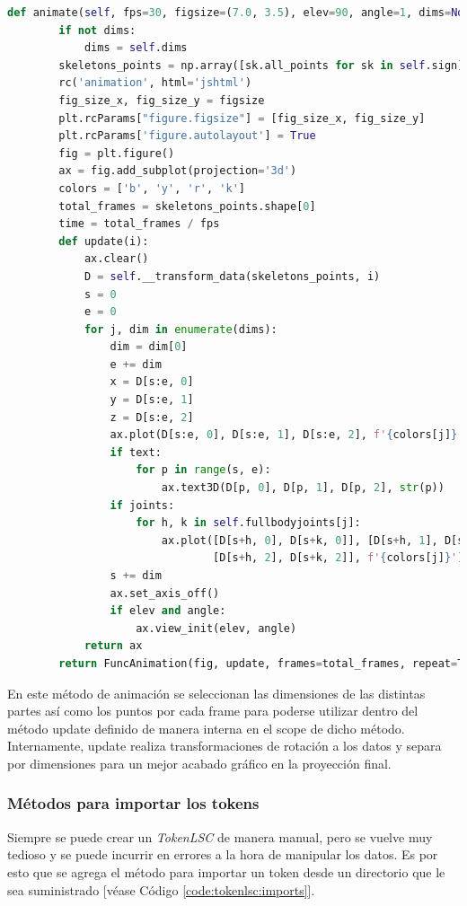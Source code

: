 \begin{lstlisting}[basicstyle=\tiny,language=Python, caption={Método animate de la clase TokenLSC}, label={code:tokenlsc:animate}] 
def animate(self, fps=30, figsize=(7.0, 3.5), elev=90, angle=1, dims=None, text=False, joints=True):
        if not dims:
            dims = self.dims
        skeletons_points = np.array([sk.all_points for sk in self.sign])
        rc('animation', html='jshtml')
        fig_size_x, fig_size_y = figsize
        plt.rcParams["figure.figsize"] = [fig_size_x, fig_size_y]
        plt.rcParams['figure.autolayout'] = True
        fig = plt.figure()
        ax = fig.add_subplot(projection='3d')
        colors = ['b', 'y', 'r', 'k']
        total_frames = skeletons_points.shape[0]
        time = total_frames / fps
        def update(i):
            ax.clear()
            D = self.__transform_data(skeletons_points, i)
            s = 0
            e = 0
            for j, dim in enumerate(dims):
                dim = dim[0]
                e += dim
                x = D[s:e, 0]
                y = D[s:e, 1]
                z = D[s:e, 2]
                ax.plot(D[s:e, 0], D[s:e, 1], D[s:e, 2], f'{colors[j]}.')
                if text:
                    for p in range(s, e):
                        ax.text3D(D[p, 0], D[p, 1], D[p, 2], str(p))
                if joints:
                    for h, k in self.fullbodyjoints[j]:
                        ax.plot([D[s+h, 0], D[s+k, 0]], [D[s+h, 1], D[s+k, 1]],
                                [D[s+h, 2], D[s+k, 2]], f'{colors[j]}')
                s += dim
                ax.set_axis_off()
                if elev and angle:
                    ax.view_init(elev, angle)
            return ax
        return FuncAnimation(fig, update, frames=total_frames, repeat=True, interval=fps)
\end{lstlisting}
En este método de animación se seleccionan las dimensiones de las distintas partes así como los puntos por cada frame para poderse utilizar dentro del método update definido de manera interna en el scope de dicho método. Internamente, update realiza transformaciones de rotación a los datos y  separa por dimensiones para un mejor acabado gráfico en la proyección final. 

\subsubsection{Métodos para importar los tokens}
Siempre se puede crear un \textit{TokenLSC} de manera manual, pero se vuelve muy tedioso y se puede incurrir en errores a la hora de manipular los datos. Es por esto que se agrega el método para importar un token desde un directorio que le sea suministrado [véase Código \ref{code:tokenlsc:imports}]. 

